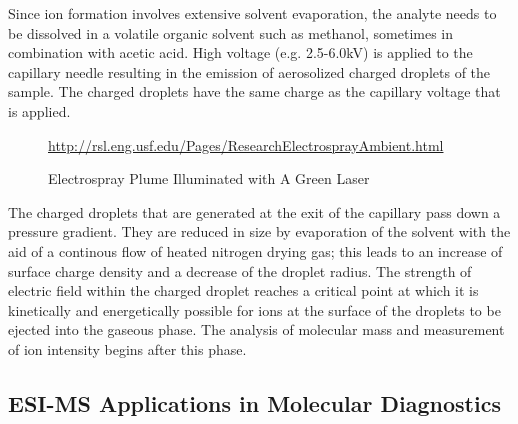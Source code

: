 \documentclass[letterpaper, 10 pt, conference]{ieeeconf}  %
\begin{document}
            Since ion formation involves extensive solvent evaporation, the analyte needs to be dissolved in a volatile organic solvent such as methanol, sometimes in combination with acetic acid. High voltage (e.g. 2.5-6.0kV) is applied to the capillary needle resulting in the emission of aerosolized charged droplets of the sample. The charged droplets have the same charge as the capillary voltage that is applied.

                \begin{figure}[h]
                    \centering
                
                    \caption{Electrospray Plume Illuminated with A Green Laser}
                    \tiny{\url{http://rsl.eng.usf.edu/Pages/ResearchElectrosprayAmbient.html}}

                \end{figure}

            The charged droplets that are generated at the exit of the capillary pass down a pressure gradient. They are reduced in size by evaporation of the solvent with the aid of a continous flow of heated nitrogen drying gas; this leads to an increase of surface charge density and a decrease of the droplet radius. The strength of electric field within the charged droplet reaches a critical point at which it is kinetically and energetically possible for ions at the surface of the droplets to be ejected into the gaseous phase. The analysis of molecular mass and measurement of ion intensity begins after this phase.\autocite{R6}

            \FloatBarrier
        
        \subsection{\textbf{ESI-MS Applications in Molecular Diagnostics}}
\end{document}
